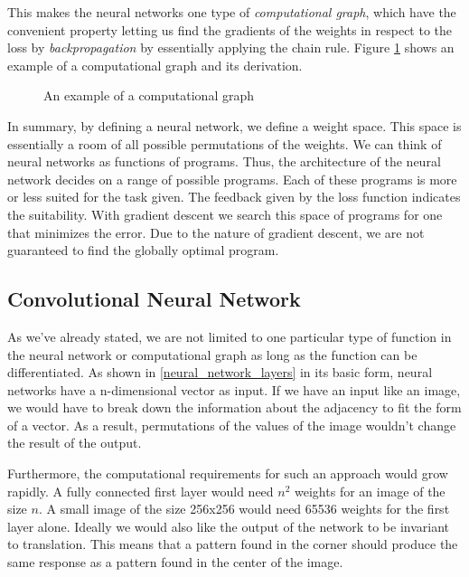 This makes the neural networks one type of \textit{computational graph}, which have the convenient property letting us find the gradients of the weights in respect to the loss by \textit{backpropagation} by essentially applying the chain rule. Figure \ref{computational_graph} shows an example of a computational graph and its derivation.

\begin{figure}[!h]
    \centering
    \caption{An example of a computational graph}
    \label{computational_graph}
\end{figure}

In summary, by defining a neural network, we define a weight space. This space is essentially a room of all possible permutations of the weights. We can think of neural networks as functions of programs. Thus, the architecture of the neural network decides on a range of possible programs. Each of these programs is more or less suited for the task given. The feedback given by the loss function indicates the suitability. With gradient descent we search this space of programs for one that minimizes the error. Due to the nature of gradient descent, we are not guaranteed to find the globally optimal program.

\subsection{Convolutional Neural Network}
As we've already stated, we are not limited to one particular type of function in the neural network or computational graph as long as the function can be differentiated. As shown in \ref{neural_network_layers} in its basic form, neural networks have a n-dimensional vector as input. If we have an input like an image, we would have to break down the information about the adjacency to fit the form of a vector. As a result, permutations of the values of the image wouldn't change the result of the output.

Furthermore, the computational requirements for such an approach would grow rapidly. A fully connected first layer would need $n^2$ weights for an image of the size $n$. A small image of the size 256x256 would need 65536 weights for the first layer alone. Ideally we would also like the output of the network to be invariant to translation. This means that a pattern found in the corner should produce the same response as a pattern found in the center of the image.

